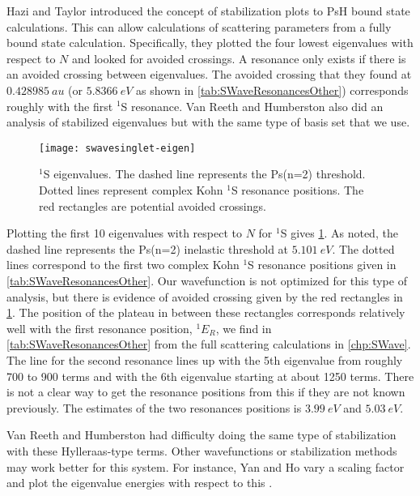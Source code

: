 \documentclass[Dissertation.tex]{subfiles}
\begin{document}
Hazi and Taylor \cite{Hazi1970} introduced the concept of stabilization plots to PsH bound state calculations. This can allow calculations of scattering parameters from a fully bound state calculation. Specifically, they plotted the four lowest eigenvalues with respect to $N$ and looked for avoided crossings. A resonance only exists if there is an avoided crossing between eigenvalues. The avoided crossing that they found at $\SI{0.428 985}{au}$ (or $\SI{5.8366}{eV}$ as shown in \cref{tab:SWaveResonancesOther}) corresponds roughly with the first $^1$S resonance. Van Reeth and Humberston \cite{VanReeth2004} also did an analysis of stabilized eigenvalues but with the same type of basis set that we use.

\begin{figure}[H]
	\centering
	\texttt{[image: swavesinglet-eigen]}
	\caption[$^1$S eigenvalues]{$^1$S eigenvalues. The dashed line represents the Ps(n=2) threshold. Dotted lines represent complex Kohn $^1$S resonance positions. The red rectangles are potential avoided crossings.}
	\label{fig:swavesinglet-eigen}
\end{figure}

Plotting the first 10 eigenvalues with respect to $N$ for $^1$S gives \cref{fig:swavesinglet-eigen}. As noted, the dashed line represents the Ps(n=2) inelastic threshold at $\SI{5.101}{eV}$. The dotted lines correspond to the first two complex Kohn $^1$S resonance positions given in \cref{tab:SWaveResonancesOther}. Our wavefunction is not optimized for this type of analysis, but there is evidence of avoided crossing given by the red rectangles in \cref{fig:swavesinglet-eigen}. The position of the plateau in between these rectangles corresponds relatively well with the first resonance position, $^1E_R$, we find in \cref{tab:SWaveResonancesOther} from the full scattering calculations in \cref{chp:SWave}. The line for the second resonance lines up with the 5th eigenvalue from roughly 700 to 900 terms and with the 6th eigenvalue starting at about 1250 terms. There is not a clear way to get the resonance positions from this if they are not known previously. The estimates of the two resonances positions is $\SI{3.99}{eV}$ and $\SI{5.03}{eV}$.

Van Reeth and Humberston \cite{VanReeth2004} had difficulty doing the same type of stabilization with these Hylleraas-type terms. Other wavefunctions or stabilization methods may work better for this system. For instance, Yan and Ho vary a scaling factor and plot the eigenvalue energies with respect to this \cite{Yan2003}.
\end{document}
